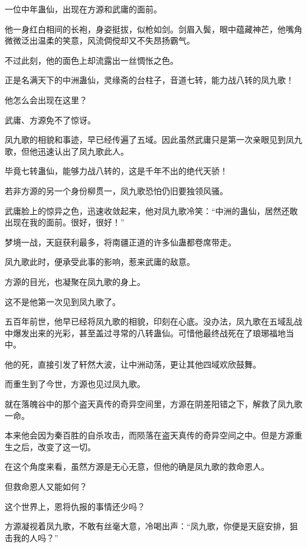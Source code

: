 
\begin{this_body}



一位中年蛊仙，出现在方源和武庸的面前。

他一身红白相间的长袍，身姿挺拔，似枪如剑。剑眉入鬓，眼中蕴藏神芒，他嘴角微微泛出温柔的笑意，风流倜傥却又不失昂扬霸气。

不过此刻，他的面色上却流露出一丝惆怅之色。

正是名满天下的中洲蛊仙，灵缘斋的台柱子，音道七转，能力战八转的凤九歌！

他怎么会出现在这里？

武庸、方源免不了惊讶。

凤九歌的相貌和事迹，早已经传遍了五域。因此虽然武庸只是第一次亲眼见到凤九歌，但他迅速认出了凤九歌此人。

毕竟七转蛊仙，能够力战八转的，这是千年不出的绝代天骄！

若非方源的另一个身份柳贯一，凤九歌恐怕仍旧要独领风骚。

武庸脸上的惊异之色，迅速收敛起来，他对凤九歌冷笑：“中洲的蛊仙，居然还敢出现在我的面前。很好，很好！”

梦境一战，天庭获利最多，将南疆正道的许多仙蛊都卷席带走。

凤九歌此时，便承受此事的影响，惹来武庸的敌意。

方源的目光，也凝聚在凤九歌的身上。

这不是他第一次见到凤九歌了。

五百年前世，他早已经将凤九歌的相貌，印刻在心底。没办法，凤九歌在五域乱战中爆发出来的光彩，甚至盖过寻常的八转蛊仙。可惜他最终战死在了琅琊福地当中。

他的死，直接引发了轩然大波，让中洲动荡，更让其他四域欢欣鼓舞。

而重生到了今世，方源也见过凤九歌。

就在落魄谷中的那个盗天真传的奇异空间里，方源在阴差阳错之下，解救了凤九歌一命。

本来他会因为秦百胜的自杀攻击，而陨落在盗天真传的奇异空间之中。但是方源重生之后，改变了这一切。

在这个角度来看，虽然方源是无心无意，但他的确是凤九歌的救命恩人。

但救命恩人又能如何？

这个世界上，恩将仇报的事情还少吗？

方源凝视着凤九歌，不敢有丝毫大意，冷喝出声：“凤九歌，你便是天庭安排，狙击我的人吗？”


\end{this_body}
